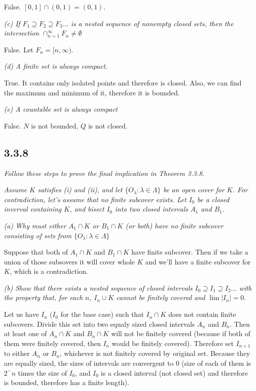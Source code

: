 \documentclass[11pt,oneside,titlepage]{book}
\begin{document}
False. $[0, 1] \cap (0, 1) = (0, 1)$.

\textit{(c) If $F_1 \supseteq F_2 \supseteq F_3 ... $ is a nested sequence
  of nonempty closed sets, then the intersection
  $\cap_{n = 1}^{\infty} F_n \neq \emptyset$}

False. Let $F_n = [n, \infty)$.

\textit{(d) A finite set is always compact.}

True. It contains only isolated points and therefore is closed. Also,
we can find the maximum and minimum of it, therefore it is bounded.

\textit{(e) A countable set is always compact}

False. $N$ is not bounded, $Q$ is not closed.

\subsection*{3.3.8}
\textit{Follow these steps to prove the final implication in Theorem 3.3.8.}

\textit{Assume $K$ satisfies (i) and (ii), and let
  $\{O_\lambda: \lambda \in \Lambda \}$ be an open cover for $K$. For
  contradiction, let's assume that no finite subcover exists. Let $I_0$ be a closed
  inverval containing $K$, and bisect $I_0$ into two closed intervals $A_1$
  and $B_1$.}

\textit{(a) Why must either $A_1 \cap K$ or $B_1 \cap K$ (or both) have no
  finite subcover consisting of sets from
  $\{O_\lambda: \lambda \in \Lambda \}$ }

Suppose that both of $A_1 \cap K$ and $B_1 \cap K$ have finite subcover.
Then if we take a union of those subsovers it will cover whole $K$ and
we'll have a finite subcover for $K$, which is a contradiction.

\textit{(b) Show that there exists a nested sequence of closed intervals
  $I_0 \supseteq I_1 \supseteq I_2 ... $ with the property that, for each $n$,
  $I_n \cup K$ cannot be finitely covered and $\lim |I_n| = 0$.}

Let us have $I_n$ ($I_0$ for the base case) such that $I_n \cap K$ does not
contain finite subcovers. Divide this set into two equaly sized closed
intervals $A_n$ and $B_n$. Then at least one of $A_n \cap K$ and $B_n \cap K$
will not be finitely covered (because if both of them were finitely covered,
then $I_n$ would be finitely covered). Therefore set $I_{n + 1}$ to either
$A_n$ or $B_n$, whichever is not finitely covered by original set.
Because they are equally sized, the sizes of intervals are convergent to 0
(size of each of them is $2^-n$ times the size of $I_0$, and $I_0$ is a
closed interval (not closed set) and therefore is bounded, therefore has a
finite length).
\end{document}
